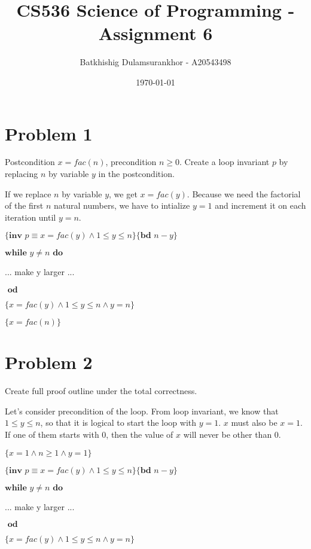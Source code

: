 \documentclass{article}
\title{CS536 Science of Programming - Assignment 6}
\author{Batkhishig Dulamsurankhor - A20543498}
\date{\today} %
\begin{document}
\maketitle


\section*{Problem 1}

Postcondition $x=fac(n)$, precondition $n \geq 0$. Create a loop invariant $p$ by replacing $n$ by variable $y$ in the postcondition.
\vspace{10pt}

If we replace $n$ by variable $y$, we get $x=fac(y)$. Because we need the factorial of the first $n$ natural numbers, we have to intialize $y=1$ and increment it on each iteration until $y=n$.
\vspace{10pt}

$\{\textbf{inv }p \equiv x=fac(y) \wedge 1 \leq y \leq n \}\{\textbf{bd } n-y\}$

$ \textbf{while } y \neq n \textbf{ do }$

\qquad \qquad ... make y larger ...

$\textbf{ od}$

$\{x=fac(y) \wedge 1 \leq y \leq n \wedge y=n\}$

$\{x=fac(n)\}$


\section*{Problem 2}

Create full proof outline under the total correctness.
\vspace{10pt}

Let's consider precondition of the loop. From loop invariant, we know that $1 \leq y \leq n$, so that it is logical to start the loop with $y=1$. $x$ must also be $x=1$. If one of them starts with $0$, then the value of $x$ will never be other than $0$.
\vspace{10pt}

$\{x=1 \wedge n \geq 1 \wedge y=1 \}$

$\{\textbf{inv }p \equiv x=fac(y) \wedge 1 \leq y \leq n \}\{\textbf{bd } n-y\}$

$ \textbf{while } y \neq n \textbf{ do }$

\qquad \qquad ... make y larger ...

$\textbf{ od}$

$\{x=fac(y) \wedge 1 \leq y \leq n \wedge y=n\}$
\end{document}
